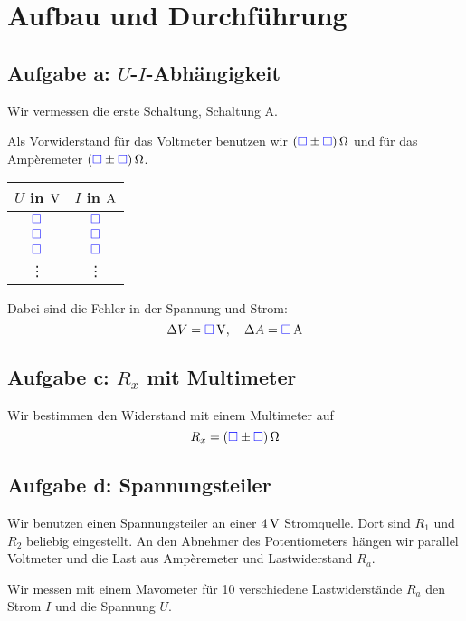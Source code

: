 \documentclass[11pt]{article}
\newcommand{\messwert}{\textcolor{blue}{\square}}
\begin{document}
\section{Aufbau und Durchführung}

\subsection{Aufgabe a: $U$-$I$-Abhängigkeit}

Wir vermessen die erste Schaltung, Schaltung A.

Als Vorwiderstand für das Voltmeter benutzen wir $\unit[(\messwert \pm
\messwert)] \Omega$ und für das Ampèremeter $\unit[(\messwert \pm \messwert)]
\Omega$.

\begin{center}
	\begin{tabular}{cc}
		$U$ in $\unit V$ & $I$ in $\unit A$ \\
		\hline
		$\messwert$ & $\messwert$ \\
		$\messwert$ & $\messwert$ \\
		$\messwert$ & $\messwert$ \\
			 \vdots & \vdots
	\end{tabular}
\end{center}

Dabei sind die Fehler in der Spannung und Strom:
\[ \Delta V = \unit[\messwert]V, \quad \Delta A = \unit[\messwert] A \]

\subsection{Aufgabe c: $R_x$ mit Multimeter}

Wir bestimmen den Widerstand mit einem Multimeter auf
\[ R_x = \unit[(\messwert \pm \messwert)]{\Omega} \]

\subsection{Aufgabe d: Spannungsteiler}

\label{durchführung-d}

Wir benutzen einen Spannungsteiler an einer $\unit[4]V$ Stromquelle. Dort sind
$R_1$ und $R_2$ beliebig eingestellt. An den Abnehmer des Potentiometers hängen
wir parallel Voltmeter und die Last aus Ampèremeter und Lastwiderstand $R_a$.

Wir messen mit einem Mavometer für 10 verschiedene Lastwiderstände $R_a$ den
Strom $I$ und die Spannung $U$.
\end{document}
